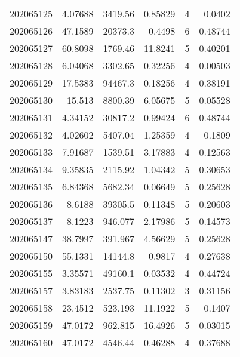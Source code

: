 \begin{tabular}{rrrrrr}
 202065125 &          4.07688 &     3419.56   &            0.85829 &           4 & 0.0402  \\
 202065126 &         47.1589  &    20373.3    &            0.4498  &           6 & 0.48744 \\
 202065127 &         60.8098  &     1769.46   &           11.8241  &           5 & 0.40201 \\
 202065128 &          6.04068 &     3302.65   &            0.32256 &           4 & 0.00503 \\
 202065129 &         17.5383  &    94467.3    &            0.18256 &           4 & 0.38191 \\
 202065130 &         15.513   &     8800.39   &            6.05675 &           5 & 0.05528 \\
 202065131 &          4.34152 &    30817.2    &            0.99424 &           6 & 0.48744 \\
 202065132 &          4.02602 &     5407.04   &            1.25359 &           4 & 0.1809  \\
 202065133 &          7.91687 &     1539.51   &            3.17883 &           4 & 0.12563 \\
 202065134 &          9.35835 &     2115.92   &            1.04342 &           5 & 0.30653 \\
 202065135 &          6.84368 &     5682.34   &            0.06649 &           5 & 0.25628 \\
 202065136 &          8.6188  &    39305.5    &            0.11348 &           5 & 0.20603 \\
 202065137 &          8.1223  &      946.077  &            2.17986 &           5 & 0.14573 \\
 202065147 &         38.7997  &      391.967  &            4.56629 &           5 & 0.25628 \\
 202065150 &         55.1331  &    14144.8    &            0.9817  &           4 & 0.27638 \\
 202065155 &          3.35571 &    49160.1    &            0.03532 &           4 & 0.44724 \\
 202065157 &          3.83183 &     2537.75   &            0.11302 &           3 & 0.31156 \\
 202065158 &         23.4512  &      523.193  &           11.1922  &           5 & 0.1407  \\
 202065159 &         47.0172  &      962.815  &           16.4926  &           5 & 0.03015 \\
 202065160 &         47.0172  &     4546.44   &            0.46288 &           4 & 0.37688 \\

\end{tabular}
